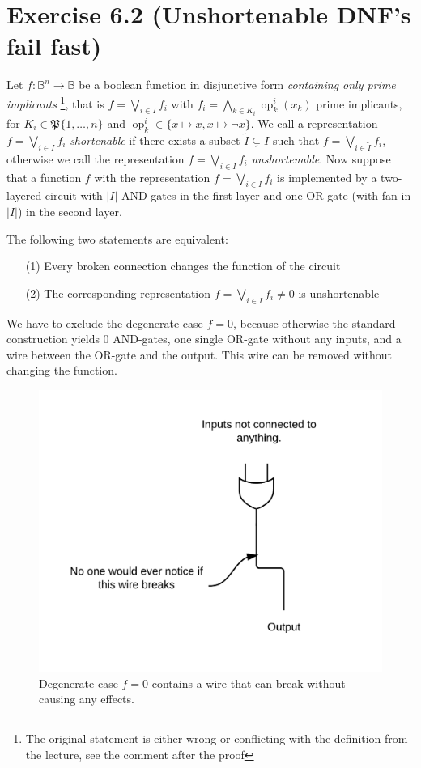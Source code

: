 \documentclass[10pt,a4paper]{scrartcl}
\DeclareMathOperator{\op}{op}
\begin{document}
\section*{Exercise 6.2 (Unshortenable DNF's fail fast)}
Let $f: \mathbb{B}^n \to \mathbb{B}$ be a boolean function in disjunctive form \emph{containing only prime implicants}
\footnote{The original statement is either wrong or conflicting with the definition from the lecture, see the comment after the proof}, that is 
$f = \bigvee_{i \in I} f_i$ with $f_i = \bigwedge_{k \in K_i} \op_k^i(x_k)$ prime implicants, for 
$K_i \in \mathfrak{P}\{1,\dots,n\}$ and $\op_k^i \in \{x \mapsto x, x \mapsto \neg x\}$.
We call a representation $f = \bigvee_{i \in I} f_i$ \emph{shortenable} if there exists
a subset $\tilde I \subsetneq I$ such that $f = \bigvee_{i \in \tilde I} f_i$, otherwise
we call the representation $f = \bigvee_{i \in I} f_i$ \emph{unshortenable}. Now suppose
that a function $f$ with the representation $f = \bigvee_{i \in I} f_i$ is implemented by
a two-layered circuit with $|I|$ AND-gates in the first layer and one OR-gate (with fan-in
$|I|$) in the second layer.

 The following two statements are equivalent:
\begin{itemize}
  \item[(1)] Every broken connection changes the function of the circuit
  \item[(2)] The corresponding representation $f = \bigvee_{i \in I} f_i \neq 0$ is unshortenable
\end{itemize}

 We have to exclude the degenerate case $f=0$, because otherwise the
standard construction yields $0$ AND-gates, one single OR-gate without any inputs, and a wire
between the OR-gate and the output. This wire can be removed without changing the function.
\begin{figure}
  \centering\includegraphics[width=0.4\linewidth]{images/exercise_6_2_degenerate.png}
  \caption{ Degenerate case $f=0$ contains a wire that can break without causing any effects.}
\end{figure}
\FloatBarrier
\end{document}
